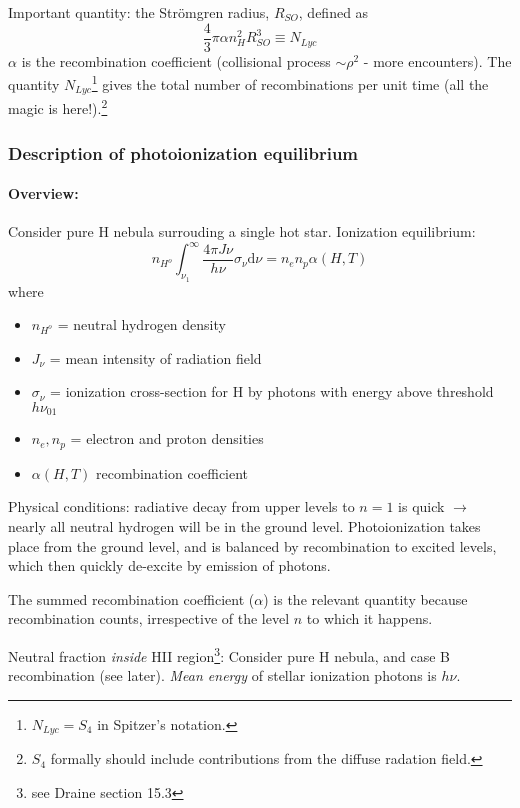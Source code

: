 \documentclass[12pt]{article}
\newcommand{\mar}[1]{\hspace{0pt}\marginpar{-{#1}-}}
\begin{document}
Important quantity: the Str\"{o}mgren radius, $R_{SO}$, defined as$${
    \frac{4}{3}\pi\alpha{n_{H}^{2}}{R_{SO}^{3}} \equiv N_{Lyc}
}$$
$\alpha$ is the recombination coefficient (collisional process
$\sim\rho^{2}$ - more encounters).
The quantity $N_{Lyc}$\footnote{$N_{Lyc} = S_{4}$ in Spitzer's notation.}
gives the total number of recombinations per unit
time (all the magic is here!).\footnote{$S_{4}$ formally should include
contributions from the diffuse radation field.}

\mar{53}\subsubsection{Description of photoionization equilibrium}
\paragraph{Overview:} Consider pure H nebula surrouding a single hot star.
Ionization equilibrium:$${
    n_{H^{o}}\int_{\nu_{1}}^{\infty}{\frac{4\pi{J\nu}}{h\nu}\sigma_{\nu}\mathrm{d}\nu} =
    n_{e}n_{p}\alpha(H,T)
}$$where
\begin{itemize}
    \item $n_{H^{o}}$ = neutral hydrogen density
    \item $J_{\nu}$ = mean intensity of radiation field
    \item $\sigma_{\nu}$ = ionization cross-section for H by photons with
        energy above threshold $h\nu_{01}$
    \item $n_{e}, n_{p}$ = electron and proton densities
    \item $\alpha(H,T)$ recombination coefficient
\end{itemize}

\mar{54}Physical conditions: radiative decay from upper levels to $n=1$ is
quick $\rightarrow$ nearly all neutral hydrogen will be in the ground
level. Photoionization takes place from the ground level, and is balanced
by recombination to excited levels, which then quickly de-excite by
emission of photons.

\mar{55}The summed recombination coefficient ($\alpha$) is the relevant
quantity because recombination counts, irrespective of the level $n$ to
which it happens.

\mar{56}Neutral fraction \emph{inside} HII region\footnote{see Draine
section 15.3}: Consider pure H nebula, and case B recombination (see
later). \emph{Mean energy} of stellar ionization photons is $h\nu$.
\end{document}
